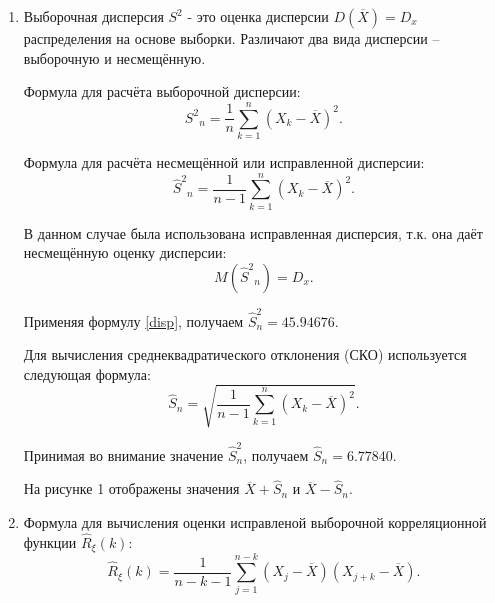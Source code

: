 \documentclass[12pt, fleqn]{article}
\begin{document}
{\begin{enumerate}
{			Используя программу из приложения А, получаем $\overline{X} = -25.07220$.
																		        
			На рисунке 1 показано значение $ \overline{X} $.
		}
		\item
		      {
		      	Выборочная дисперсия $S^2$ - это оценка дисперсии $D(\overline{X})=D_x$ распределения на основе выборки.
		      	Различают два вида дисперсии -- выборочную и несмещённую.
		      			      			      			      			      			      	        
		      	Формула для расчёта выборочной дисперсии:
		      	\begin{equation}
		      		{S^2}_n=\frac{1}{n}\sum_{k=1}^{n}{(X_k - \overline{X})^2}.
		      	\end{equation}
		      			      			      			      			      			      	        
		      	Формула для расчёта несмещённой или исправленной дисперсии:
		      	\begin{equation}\label{disp}
		      		{\hat{S}^2}_n=\frac{1}{n-1}\sum_{k=1}^{n}{(X_k - \overline{X})^2}.
		      	\end{equation}
		      			      			      			      			      			      	        
		      	В данном случае была использована исправленная дисперсия, т.к. она даёт несмещённую оценку дисперсии:
		      	\begin{equation}
		      		M({\hat{S}^2}_n)=D_x.
		      	\end{equation}
		      			      			      			      			      			      	        
		      	Применяя формулу \eqref{disp}, получаем $\hat{S}^2_n = 45.94676$.
		      			      			      			      			      			      	        
		      	Для вычисления среднеквадратического отклонения (СКО) используется следующая формула:
		      	\begin{equation}
		      		\hat{S}_n=\sqrt{\frac{1}{n-1}\sum_{k=1}^{n}{(X_k - \overline{X})^2}}.
		      	\end{equation}
		      			      			      			      			      			      	        
		      	Принимая во внимание значение $ \hat{S}^2_n $, получаем $ \hat{S}_n = 6.77840 $.
		      			      			      			      			      			      	        
		      	На рисунке 1 отображены значения $ \overline{X} + \hat{S}_n $ и $ \overline{X} - \hat{S}_n $.
		      }
		\item
		      {
		      	Формула для вычисления оценки исправленой выборочной корреляционной функции $ \hat{R}_\xi(k) $:		      			      			      			      		  	
		      	\begin{equation}\label{corr_func}
		      		\hat{R}_\xi(k) = \frac{1}{n - k - 1} \sum_{j=1}^{n - k} {(X_j - \overline{X})(X_{j+k}-\overline{X})}.
		      	\end{equation}
		      			      			      			      			      			      		  	
}
\end{enumerate}}
\end{document}
